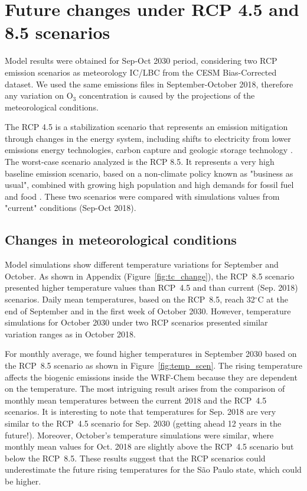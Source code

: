 \section{Future changes under RCP 4.5 and 8.5 scenarios} \label{sec:res_fut}
Model results were obtained for Sep-Oct 2030 period, considering two RCP emission scenarios as meteorology IC/LBC from the CESM Bias-Corrected dataset. We used the same emissions files in September-October 2018, therefore any variation on O$_3$ concentration is caused by the projections of the meteorological conditions.

The RCP 4.5 is a stabilization scenario that represents an emission mitigation through changes in the energy system, including shifts to electricity from lower emissions energy technologies, carbon capture and geologic storage technology \citep{Thomson2011}.
The worst-case scenario analyzed is the RCP 8.5.
It represents a very high baseline emission scenario, based on a non-climate policy known as "business as usual", combined with growing high population and high demands for fossil fuel and food \citep{Riahi2011}.
These two scenarios were compared with simulations values from "current" conditions (Sep-Oct 2018).

\subsection{Changes in meteorological conditions}\label{subsec:res_chan_met}
Model simulations show different temperature variations for September and October.
As shown in Appendix (Figure~\ref{fig:tc_change}), the RCP~8.5 scenario presented higher temperature values than RCP~4.5 and than current (Sep. 2018) scenarios.
Daily mean temperatures, based on the RCP~8.5, reach 32$^\circ$C at the end of September and in the first week of October 2030.
However, temperature simulations for October 2030 under two RCP scenarios presented similar variation ranges as in October 2018.

For monthly average, we found higher temperatures in September 2030 based on the RCP~8.5 scenario as shown in Figure~\ref{fig:temp_scen}.
The rising temperature affects the biogenic emissions inside the WRF-Chem because they are dependent on the temperature.
The most intriguing result arises from the comparison of monthly mean temperatures between the current 2018 and the RCP~4.5 scenarios.
It is interesting to note that temperatures for Sep. 2018 are very similar to the RCP~4.5 scenario for Sep. 2030 (getting ahead 12 years in the future!).
Moreover, October's temperature simulations were similar, where monthly mean values for Oct. 2018 are slightly above the RCP~4.5 scenario but below the RCP~8.5.
These results suggest that the RCP scenarios could underestimate the future rising temperatures for the S\~{a}o Paulo state, which could be higher.

